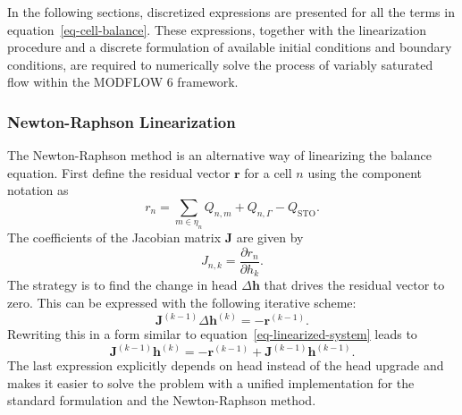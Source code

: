 \documentclass[fleqn]{article}
\begin{document}
In the following sections, discretized expressions are presented for
all the terms in equation~\ref{eq-cell-balance}. These expressions,
together with the linearization procedure and a discrete
formulation of available initial conditions and boundary conditions, 
are required to numerically solve the process of variably saturated 
flow within the MODFLOW 6 framework.

\subsubsection*{Newton-Raphson Linearization}
The Newton-Raphson method is an alternative way of linearizing the
balance equation. First define the residual vector $\mathbf{r}$
for a cell $n$ using the component notation as
\begin{equation}
  r_n = \sum_{m \in \eta_n} Q_{n,m} + 
        Q_{n, \Gamma} - 
        Q_{\textrm{STO}}.
  \label{eq-residual-cell}
\end{equation}
The coefficients of the Jacobian matrix $\mathbf{J}$ are given by
\begin{equation}
  J_{n,k} = \frac{\partial r_n}{\partial h_k}.
  \label{eq-jacobian}
\end{equation}
The strategy is to find the change in head $\Delta\mathbf{h}$ that
drives the residual vector to zero. This can be expressed with the
following iterative scheme:
\begin{equation}
  \mathbf{J}^{(k-1)} \Delta \mathbf{h}^{(k)} = -\mathbf{r}^{(k-1)}.
\end{equation}
Rewriting this in a form similar to equation~\ref{eq-linearized-system}
leads to
\begin{equation}
  \mathbf{J}^{(k-1)} \mathbf{h}^{(k)} = 
  -\mathbf{r}^{(k-1)} + \mathbf{J}^{(k-1)} \mathbf{h}^{(k-1)}.
  \label{eq-newton-head}
\end{equation}
The last expression explicitly depends on head instead of the
head upgrade and makes it easier to solve the problem with a
unified implementation for the standard formulation and the
Newton-Raphson method.
\end{document}
